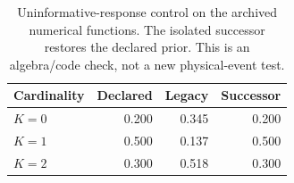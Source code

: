 \begin{table}[t]\centering\small
\caption{Uninformative-response control on the archived numerical functions. The isolated successor restores the declared prior. This is an algebra/code check, not a new physical-event test.}
\label{tab:review-normalization}
\begin{tabular}{lrrr}\toprule
Cardinality & Declared & Legacy & Successor\\\midrule
$K=0$ & 0.200 & 0.345 & 0.200\\
$K=1$ & 0.500 & 0.137 & 0.500\\
$K=2$ & 0.300 & 0.518 & 0.300\\
\bottomrule\end{tabular}\end{table}
